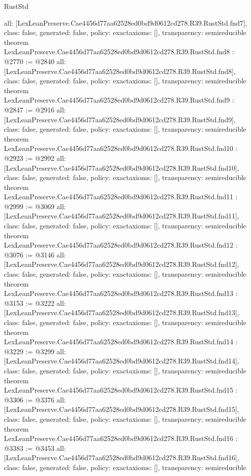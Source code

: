 \begin{lexlean}{RustStd}
\begin{coremodule}
{  all: [LexLeanPreserve.Cae4456d77aa62528ed0bd9d0612cd278.R39.RustStd.fnd7],
  class: false,
  generated: false,
  policy: exact{axioms: []},
  transparency: semireducible
}
theorem LexLeanPreserve.Cae4456d77aa62528ed0bd9d0612cd278.R39.RustStd.fnd8 : @2770 := @2840 {
  all: [LexLeanPreserve.Cae4456d77aa62528ed0bd9d0612cd278.R39.RustStd.fnd8],
  class: false,
  generated: false,
  policy: exact{axioms: []},
  transparency: semireducible
}
theorem LexLeanPreserve.Cae4456d77aa62528ed0bd9d0612cd278.R39.RustStd.fnd9 : @2847 := @2916 {
  all: [LexLeanPreserve.Cae4456d77aa62528ed0bd9d0612cd278.R39.RustStd.fnd9],
  class: false,
  generated: false,
  policy: exact{axioms: []},
  transparency: semireducible
}
theorem LexLeanPreserve.Cae4456d77aa62528ed0bd9d0612cd278.R39.RustStd.fnd10 : @2923 := @2992 {
  all: [LexLeanPreserve.Cae4456d77aa62528ed0bd9d0612cd278.R39.RustStd.fnd10],
  class: false,
  generated: false,
  policy: exact{axioms: []},
  transparency: semireducible
}
theorem LexLeanPreserve.Cae4456d77aa62528ed0bd9d0612cd278.R39.RustStd.fnd11 : @2999 := @3069 {
  all: [LexLeanPreserve.Cae4456d77aa62528ed0bd9d0612cd278.R39.RustStd.fnd11],
  class: false,
  generated: false,
  policy: exact{axioms: []},
  transparency: semireducible
}
theorem LexLeanPreserve.Cae4456d77aa62528ed0bd9d0612cd278.R39.RustStd.fnd12 : @3076 := @3146 {
  all: [LexLeanPreserve.Cae4456d77aa62528ed0bd9d0612cd278.R39.RustStd.fnd12],
  class: false,
  generated: false,
  policy: exact{axioms: []},
  transparency: semireducible
}
theorem LexLeanPreserve.Cae4456d77aa62528ed0bd9d0612cd278.R39.RustStd.fnd13 : @3153 := @3222 {
  all: [LexLeanPreserve.Cae4456d77aa62528ed0bd9d0612cd278.R39.RustStd.fnd13],
  class: false,
  generated: false,
  policy: exact{axioms: []},
  transparency: semireducible
}
theorem LexLeanPreserve.Cae4456d77aa62528ed0bd9d0612cd278.R39.RustStd.fnd14 : @3229 := @3299 {
  all: [LexLeanPreserve.Cae4456d77aa62528ed0bd9d0612cd278.R39.RustStd.fnd14],
  class: false,
  generated: false,
  policy: exact{axioms: []},
  transparency: semireducible
}
theorem LexLeanPreserve.Cae4456d77aa62528ed0bd9d0612cd278.R39.RustStd.fnd15 : @3306 := @3376 {
  all: [LexLeanPreserve.Cae4456d77aa62528ed0bd9d0612cd278.R39.RustStd.fnd15],
  class: false,
  generated: false,
  policy: exact{axioms: []},
  transparency: semireducible
}
theorem LexLeanPreserve.Cae4456d77aa62528ed0bd9d0612cd278.R39.RustStd.fnd16 : @3383 := @3453 {
  all: [LexLeanPreserve.Cae4456d77aa62528ed0bd9d0612cd278.R39.RustStd.fnd16],
  class: false,
  generated: false,
  policy: exact{axioms: []},
  transparency: semireducible
}

\end{coremodule}
\end{lexlean}
